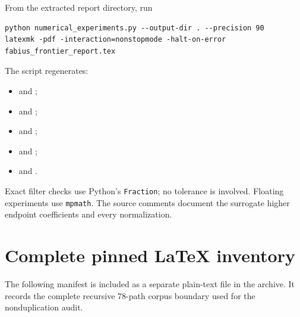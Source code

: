\documentclass[11pt,oneside]{article}
\numberwithin{equation}{section}
\theoremstyle{definition}
\theoremstyle{remark}
\begin{document}
From the extracted report directory, run
\begin{lstlisting}[style=code]
python numerical_experiments.py --output-dir . --precision 90
latexmk -pdf -interaction=nonstopmode -halt-on-error fabius_frontier_report.tex
\end{lstlisting}
The script regenerates:
\begin{itemize}
\item {} and ;
\item {} and ;
\item {} and ;
\item {} and ;
\item {} and .
\end{itemize}
Exact filter checks use Python's \texttt{Fraction}; no tolerance is involved.  Floating
experiments use \texttt{mpmath}.  The source comments document the surrogate higher endpoint
coefficients and every normalization.

\section{Complete pinned LaTeX inventory}
\label{app:inventory}

The following manifest is included as a separate plain-text file in the archive.  It records
the complete recursive 78-path corpus boundary used for the nonduplication audit.


\end{document}

